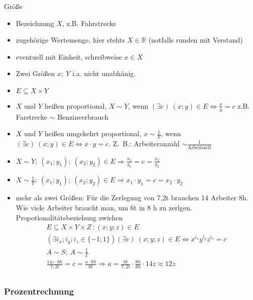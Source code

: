 Größe
\begin{itemize}
    \item Bezeichnung $X$, z.B. Fahrstrecke
    \item zugehörige Wertemenge, hier stehts $X\in \mathbb{R}$ (notfalls runden mit Verstand)
    \item eventuell mit Einheit, schreibweise $x \in X$
    \item Zwei Größen $x;\ Y$ i.a. nicht unabhänig.
    \item $E \subseteq X \times Y$
    \item $X$ und $Y$ heißen proportional, $X \sim Y$, wenn $(\exists c)\ (x;y) \in E \Leftrightarrow \frac{x}{y}=c$ z.B. Farstrecke $\sim$ Benzinverbrauch
    \item $X$ und $Y$ heißen umgekehrt proportional, $x \sim \frac{1}{Y}$, wenn $(\exists c)\ (x;y) \in E \Leftrightarrow x \cdot y = c$.
    Z.~B.: Arbeiteranzahl $\sim \frac{1}{\textrm{Arbeitszeit}}$
    \item $X \sim Y;\ (x_1;y_1);\ (x_2;y_2) \in E \Rightarrow \frac{x_1}{y_1} = c = \frac{x_2}{y_2}$
    \item $X \sim \frac{1}{Y};\ (x_1;y_1);\ (x_2;y_2) \in E \Rightarrow x_1 \cdot y_1 = c = x_2 \cdot y_2$
    \item mehr als zwei Größen: Für die Zerlegung von 7,2t brauchen 14 Arbeiter 8h.
    Wie viele Arbeiter braucht man, um 6t in 8 h zu zerlgen. \\
    Propotionalitätsbeziehung zwichen \begin{gather*}
                                          E \subseteq X \times  Y \times Z\ : (x; y; z) \in E\\
                                          (\exists i_x; i_y; i_z \in \lbrace -1; 1 \rbrace) (\exists c)\ (x;y;z) \in E \Leftrightarrow x^{i_x}y^{i_y}z^{i_z} = c\\
                                          A \sim S;\ A \sim \frac{1}{T}\\
                                          \frac{14z \cdot 8h}{7{,}2t}=c=\frac{a \cdot 8h}{6t} \Rightarrow a = \frac{6t}{7{,}2t}\cdot \frac{8h}{8h} \cdot 14z \approx 12z\\
    \end{gather*}
\end{itemize}

\subsubsection{Prozentrechnung}

